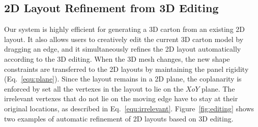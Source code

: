 \subsection{2D Layout Refinement from 3D Editing}
Our system is highly efficient for generating a 3D carton from an existing 2D layout. It also 
allows users to creatively edit the current 3D carton model by dragging an edge, and it simultaneously refines the 2D layout automatically according to the 3D editing.
%
When the 3D mesh changes, the new shape constraints are transferred to the 2D layouts by maintaining the panel rigidity (Eq.~\ref{equ:plane}).
Since the layout remains in a 2D plane, the coplanarity is enforced by set all the vertexes in the layout to lie on the $XoY$ plane.  
% 
The irrelevant vertexes that do not lie on the moving edge have to stay at their original locations, as described in Eq.~\ref{equ:irrelevant}.
Figure~\ref{fig:editing} shows two examples of automatic refinement of 2D layouts based on 3D editing.                                                                     



